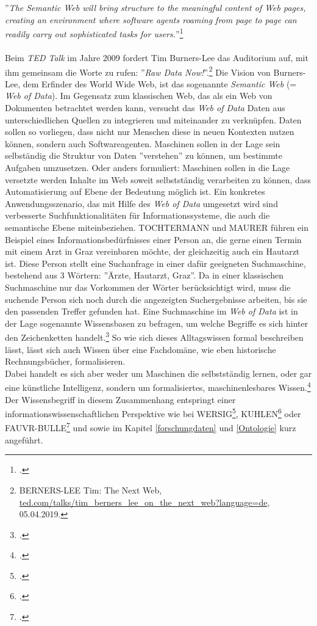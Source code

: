 \documentclass[12pt,a4paper]{article}
\begin{document}
''\textit{The Semantic Web will bring structure to the meaningful content of Web pages, creating an environment where software agents roaming from page to page can readily carry out sophisticated tasks for users.}''\footcite[][S.3]{berners2001semantic}
\\
\\
Beim \textit{TED Talk} im Jahre 2009 fordert Tim Burners-Lee das Auditorium auf, mit ihm gemeinsam die Worte zu rufen: ''\textit{Raw Data Now!}''.\footnote{BERNERS-LEE Tim: The Next Web, \url{ted.com/talks/tim_berners_lee_on_the_next_web?language=de}, 05.04.2019.} Die Vision von Burners-Lee, dem Erfinder des World Wide Web, ist das sogenannte \textit{Semantic Web} (= \textit{Web of Data}). Im Gegensatz zum klassischen Web, das als ein Web von Dokumenten betrachtet werden kann, versucht das \textit{Web of Data} Daten aus unterschiedlichen Quellen zu integrieren und miteinander zu verknüpfen. Daten sollen so vorliegen, dass nicht nur Menschen diese in neuen Kontexten nutzen können, sondern auch Softwareagenten. Maschinen sollen in der Lage sein selbständig die Struktur von Daten ''verstehen'' zu können, um bestimmte Aufgaben umzusetzen. Oder anders formuliert: Maschinen sollen in die Lage versetzte werden Inhalte im Web soweit selbstständig verarbeiten zu können, dass Automatisierung auf Ebene der Bedeutung möglich ist. Ein konkretes Anwendungsszenario, das mit Hilfe des \textit{Web of Data} umgesetzt wird sind verbesserte Suchfunktionalitäten für Informationssysteme, die auch die semantische Ebene miteinbeziehen. TOCHTERMANN und MAURER führen ein Beispiel eines Informationsbedürfnisses einer Person an, die gerne einen Termin mit einem Arzt in Graz vereinbaren möchte, der gleichzeitig auch ein Hautarzt ist. Diese Person stellt eine Suchanfrage in einer dafür geeigneten Suchmaschine, bestehend aus 3 Wörtern: ''Ärzte, Hautarzt, Graz''. Da in einer klassischen Suchmaschine nur das Vorkommen der Wörter berücksichtigt wird, muss die suchende Person sich noch durch die angezeigten Suchergebnisse arbeiten, bis sie den passenden Treffer gefunden hat. Eine Suchmaschine im \textit{Web of Data} ist in der Lage sogenannte Wissensbasen zu befragen, um welche Begriffe es sich hinter den Zeichenketten handelt.\footcite[S.1-2]{pellegrini2006semantic} So wie sich dieses Alltagswissen formal beschreiben lässt, lässt sich auch Wissen über eine Fachdomäne, wie eben historische Rechnungsbücher, formalisieren.
\\
Dabei handelt es sich aber weder um Maschinen die selbstständig lernen, oder gar eine künstliche Intelligenz, sondern um formalisiertes, maschinenlesbares Wissen.\footcite[S.1-6]{pellegrini2006semantic} Der Wissensbegriff in diesem Zusammenhang entspringt einer informationswissenschaftlichen Perspektive wie bei WERSIG\footcite{wersig1971information}, KUHLEN\footcite{weller2013InformationBand} oder FAUVR-BULLE\footcite{favre2001information} und sowie im Kapitel \ref{forschungdaten} und \ref{Ontologie} kurz angeführt.
\end{document}
